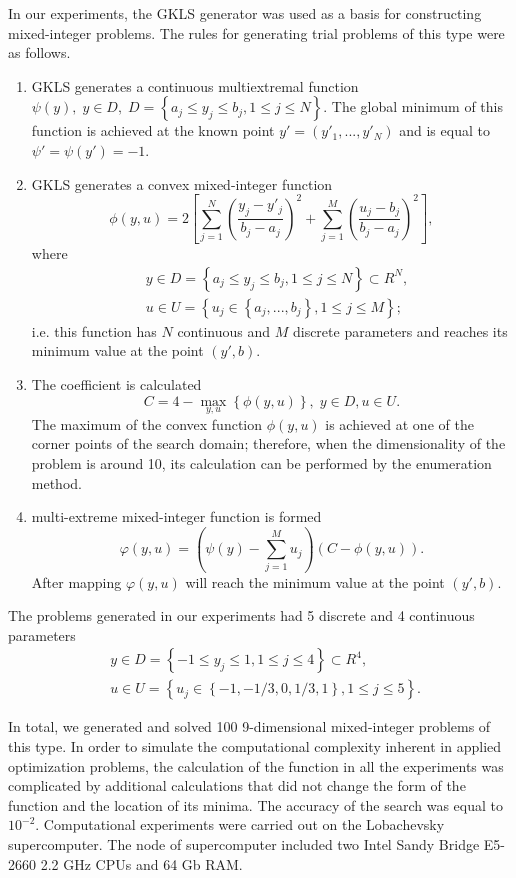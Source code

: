 \documentclass[
11pt,%
tightenlines,%
twoside,%
onecolumn,%
nofloats,%
nobibnotes,%
nofootinbib,%
superscriptaddress,%
noshowpacs,%
centertags]%
{revtex4}
\begin{document}
In our experiments, the GKLS generator was used as a basis for constructing mixed-integer problems. The rules for generating trial problems of this type were as follows.

\begin{enumerate}
	\item GKLS generates a continuous multiextremal function $\psi(y), \; y\in D, \; D = \left\{ a_j\leq y_j\leq b_j, 1\leq j \leq N \right\}$. The global minimum of this function is achieved at the known point $y'=(y'_1,...,y'_N)$ and is equal to $\psi'=\psi(y')=-1$.
	\item GKLS generates a convex mixed-integer function
	\[
			\phi (y,u) = 2 \left[ \sum_{j=1}^N \left( \frac{y_j - y'_j}{b_j-a_j} \right)^2 + \sum_{j=1}^M \left( \frac{u_j - b_j}{b_j-a_j} \right)^2 \right],
	\]
	where 
	\begin{eqnarray*}
	& y\in D = \left\{ a_j\leq y_j\leq b_j, 1\leq j \leq N \right\} \subset R^N, \\
	& u\in U = \left\{ u_j \in  \left\{a_j, ..., b_j \right\}, 1\leq j \leq M \right\};
	\end{eqnarray*}
	i.e. this function has $N$ continuous and $M$ discrete parameters and reaches its minimum value at the point $(y',b)$.
	\item The coefficient is calculated
	\[
	C = 4 - \max_{y,u} \left\{ \phi(y,u) \right\}, \; y\in D, u \in U.
	\]
	The maximum of the convex function $\phi(y,u)$ is achieved at one of the corner points of the search domain; therefore, when the dimensionality of the problem is around 10, its calculation can be performed by the enumeration method. 
	\item  multi-extreme mixed-integer function is formed
	\[
	\varphi(y,u) = \left(\psi(y) - \sum_{j=1}^M{u_j}\right)\left(C - \phi(y,u)\right).
	\]
	After mapping $\varphi(y,u)$  will reach the minimum value at the point  $(y',b)$.
	
\end{enumerate}


The problems generated in our experiments had 5 discrete and 4 continuous parameters 
	\begin{eqnarray*}
	& y\in D = \left\{ -1 \leq y_j\leq 1, 1\leq j \leq 4 \right\} \subset R^4, \\
	& u\in U = \left\{ u_j \in  \left\{-1, -1/3, 0, 1/3, 1 \right\}, 1\leq j \leq 5 \right\}.
	\end{eqnarray*}


In total, we generated and solved 100 9-dimensional mixed-integer problems of this type. In order to simulate the computational complexity inherent in applied optimization problems, the calculation of the function in all the experiments was complicated by additional calculations that did not change the form of the function and the location of its minima.
The accuracy of the search was equal to $10^{-2}$. Computational experiments were carried out on the Lobachevsky supercomputer. The node of supercomputer included two Intel Sandy Bridge E5-2660 2.2 GHz CPUs and 64 Gb RAM. 
\end{document}
